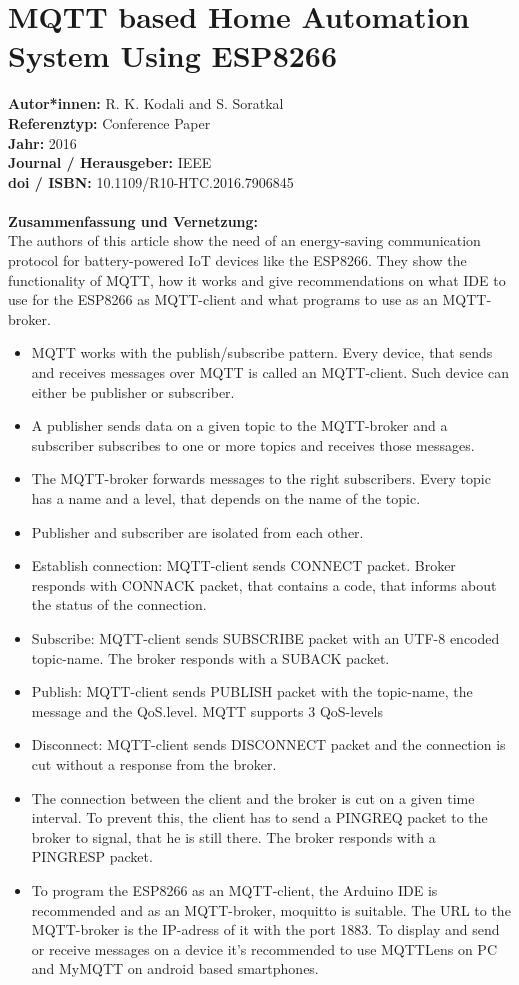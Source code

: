 \documentclass{report}
\begin{document}
{\let\clearpage\relax \chapter{MQTT based Home Automation System Using
ESP8266}}
\noindent
\textbf{Autor*innen:} R. K. Kodali and S. Soratkal\\
\textbf{Referenztyp:} Conference Paper\\
\textbf{Jahr:} 2016\\
\textbf{Journal / Herausgeber:} IEEE\\
\textbf{doi / ISBN:} 10.1109/R10-HTC.2016.7906845\\\\
\textbf{Zusammenfassung und Vernetzung:}\\
The authors of this article show the need of an energy-saving communication protocol for battery-powered IoT devices like the ESP8266.
They show the functionality of MQTT, how it works and give recommendations on what IDE to use for the ESP8266 as MQTT-client and what programs to use as an MQTT-broker.\\
\begin{itemize}
    \item MQTT works with the publish/subscribe pattern. Every device, that sends and receives messages over MQTT is called an MQTT-client. Such device can either be publisher or subscriber.
    \item A publisher sends data on a given topic to the MQTT-broker and a subscriber subscribes to one or more topics and receives those messages.
    \item The MQTT-broker forwards messages to the right subscribers. Every topic has a name and a level, that depends on the name of the topic.
    \item Publisher and subscriber are isolated from each other.
    \item Establish connection: MQTT-client sends CONNECT packet. Broker responds with CONNACK packet, that contains a code, that informs about the status of the connection.
    \item Subscribe: MQTT-client sends SUBSCRIBE packet with an UTF-8 encoded topic-name. The broker responds with a SUBACK packet.
    \item Publish: MQTT-client sends PUBLISH packet with the topic-name, the message and the QoS.level. MQTT supports 3 QoS-levels
    \item Disconnect: MQTT-client sends DISCONNECT packet and the connection is cut without a response from the broker.
    \item The connection between the client and the broker is cut on a given time interval. To prevent this, the client has to send a PINGREQ packet to the broker to signal, that he is still there. The broker responds with a PINGRESP packet.
    \item To program the ESP8266 as an MQTT-client, the Arduino IDE is recommended and as an MQTT-broker, moquitto is suitable. The URL to the MQTT-broker is the IP-adress of it with the port 1883. To display and send or receive messages on a device it's recommended to use MQTTLens on PC and MyMQTT on android  based smartphones.
\end{itemize}
\end{document}
